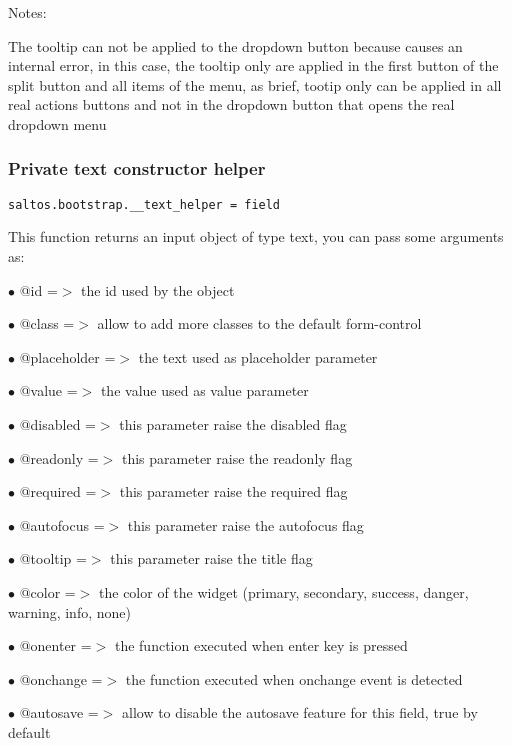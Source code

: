 \documentclass[a4paper]{article}
\begin{document}
Notes:

The tooltip can not be applied to the dropdown button because causes an internal error,
in this case, the tooltip only are applied in the first button of the split button and
all items of the menu, as brief, tootip only can be applied in all real actions buttons
and not in the dropdown button that opens the real dropdown menu

\hypertarget{toc651}{}
\subsubsection{Private text constructor helper}

\begin{lstlisting}
saltos.bootstrap.__text_helper = field
\end{lstlisting}

This function returns an input object of type text, you can pass some arguments as:

\begin{compactitem}
\item[\color{myblue}$\bullet$] @id          =$>$ the id used by the object
\item[\color{myblue}$\bullet$] @class       =$>$ allow to add more classes to the default form-control
\item[\color{myblue}$\bullet$] @placeholder =$>$ the text used as placeholder parameter
\item[\color{myblue}$\bullet$] @value       =$>$ the value used as value parameter
\item[\color{myblue}$\bullet$] @disabled    =$>$ this parameter raise the disabled flag
\item[\color{myblue}$\bullet$] @readonly    =$>$ this parameter raise the readonly flag
\item[\color{myblue}$\bullet$] @required    =$>$ this parameter raise the required flag
\item[\color{myblue}$\bullet$] @autofocus   =$>$ this parameter raise the autofocus flag
\item[\color{myblue}$\bullet$] @tooltip     =$>$ this parameter raise the title flag
\item[\color{myblue}$\bullet$] @color       =$>$ the color of the widget (primary, secondary, success, danger, warning, info, none)
\item[\color{myblue}$\bullet$] @onenter     =$>$ the function executed when enter key is pressed
\item[\color{myblue}$\bullet$] @onchange    =$>$ the function executed when onchange event is detected
\item[\color{myblue}$\bullet$] @autosave    =$>$ allow to disable the autosave feature for this field, true by default
\end{compactitem}
\end{document}
